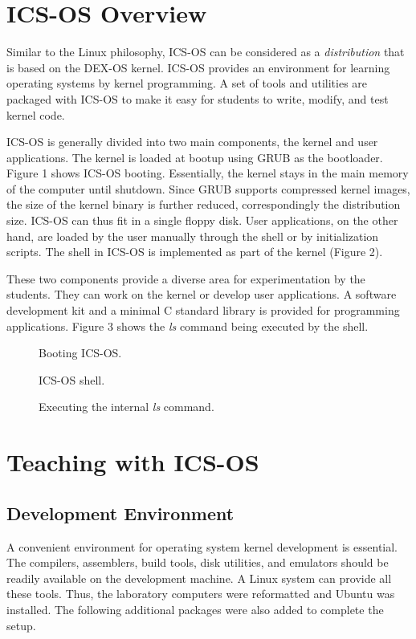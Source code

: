 \documentclass{acm_proc_article-sp}
\begin{document}
\section{ICS-OS Overview}
Similar to the Linux philosophy, ICS-OS can be considered as a 
\textit{distribution} that is based on the DEX-OS kernel. ICS-OS provides 
an environment for learning operating systems by kernel programming. 
A set of tools and utilities are packaged with ICS-OS to make it easy 
for students to write, modify, and test kernel code. 

ICS-OS is generally divided into two main components, the kernel and user 
applications. The kernel is loaded at bootup using GRUB as the bootloader.
Figure 1 shows ICS-OS booting. Essentially, the kernel stays in the main memory
of the computer until shutdown. Since GRUB supports compressed kernel images, 
the size of the kernel binary is further reduced, correspondingly the 
distribution size. ICS-OS can thus fit in a single floppy disk. User 
applications, on the other hand, are loaded by the user manually through the
shell or by initialization scripts. The shell in ICS-OS is implemented as part 
of the kernel (Figure 2).

These two components provide a diverse area for experimentation by the students.
They can work on the kernel or develop user applications. A software 
development kit and a minimal C standard library is provided for programming 
applications. Figure 3 shows the \textit{ls} command being executed by the 
shell.


\begin{figure}
\centering
{}
\caption{Booting ICS-OS.}
\end{figure}

\begin{figure}
\centering
{}
\caption{ICS-OS shell.}
\end{figure}

\begin{figure}
\centering
{}
\caption{Executing the internal \textit{ls} command.}
\end{figure}


\section{Teaching with ICS-OS}

\subsection{Development Environment}
A convenient environment for operating system kernel development is essential.
The compilers, assemblers, build tools, disk utilities, and emulators should
be readily available on the development machine. A Linux system can 
provide all these tools. Thus, the laboratory computers were reformatted and
Ubuntu was installed. The following additional packages were also added to 
complete the setup.
\end{document}
